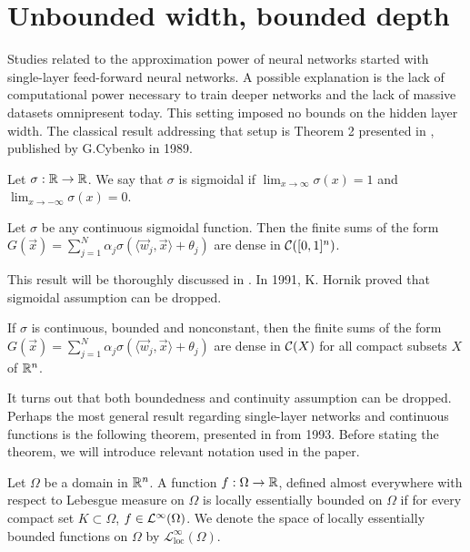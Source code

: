 \section{Unbounded width, bounded depth}
\label{section:literature-review:unbounded_width}
Studies related to the approximation power of neural networks started with single-layer feed-forward neural networks. A possible explanation is the lack of computational power necessary to train deeper networks and the lack of massive datasets omnipresent today. This setting imposed no bounds on the hidden layer width. The classical result addressing that setup is Theorem 2 presented in \cite{cybenko_1989_approximation}, published by G.Cybenko in 1989.
\begin{definition}
Let $\sigma : {\mathbb R} \to {\mathbb R}$. We say that $\sigma$ is sigmoidal if $\lim_{x \to \infty} \sigma(x) = 1$ and $\lim_{x \to -\infty} \sigma(x) = 0$.
\end{definition}
\begin{theorem}
Let $\sigma$ be any continuous sigmoidal function. Then the finite sums of the form $G(\vec{x}) = \sum_{j = 1}^N \alpha_j \sigma(\langle \vec{w}_j, \vec{x} \rangle + \theta_j)$
are dense in ${\mathcal C}([0,1]^n)$.
\end{theorem}
This result will be thoroughly discussed in .
In 1991, K. Hornik proved that sigmoidal assumption can be dropped.
\begin{theorem}
If $\sigma$ is continuous, bounded and nonconstant, then the finite sums of the form $G(\vec{x}) = \sum_{j = 1}^N \alpha_j \sigma(\langle \vec{w}_j, \vec{x} \rangle + \theta_j)$
are dense in ${\mathcal C}(X)$ for all compact subsets $X$ of ${\mathbb R}^n$.
\end{theorem}
It turns out that both boundedness and continuity assumption can be dropped.
Perhaps the most general result regarding single-layer networks and continuous functions is the following theorem, presented in \cite{leshno_1993_multilayer} from 1993.
Before stating the theorem, we will introduce relevant notation used in the paper.
\begin{definition}
Let $\Omega$ be a domain in ${\mathbb R}^n$. A function $f : \Omega \to {\mathbb R}$, defined almost everywhere with respect to Lebesgue measure on $\Omega$ is locally essentially bounded on $\Omega$ if for every compact set $K \subset \Omega$, $f \in {\mathcal {L}^\infty}(\Omega)$. We denote the space of locally essentially bounded functions on $\Omega$ by $\mathcal{L}_{\operatorname{loc}}^\infty(\Omega)$.
\end{definition}
